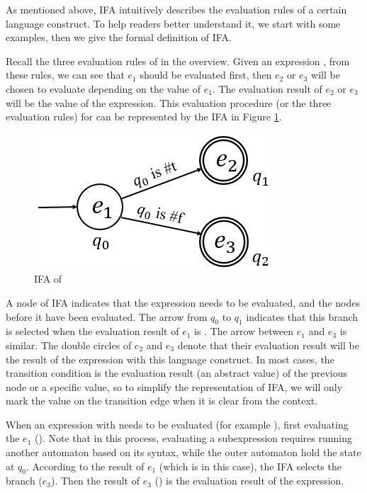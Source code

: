 As mentioned above, IFA intuitively describes the evaluation rules of a certain language construct. To help readers better understand it, we start with some examples, then we give the formal definition of IFA.

\begin{example}[IFA of~~ \m{if}]

    Recall the three evaluation rules of  in the overview. Given an expression , from these rules, we can see that $e_1$ should be evaluated first, then $e_2$ or $e_3$ will be chosen to evaluate depending on the value of $e_1$. The evaluation result of $e_2$ or $e_3$ will be the value of the expression. This evaluation procedure (or the three evaluation rules) for  can be represented by the IFA in Figure \ref{fig:ifa-if}.

    \begin{figure}[t]
        \centering
        \includegraphics[scale=0.25]{images/ifa/ifa-if.png}
        \caption{IFA of }
        \label{fig:ifa-if}
    \end{figure}

    A node of IFA indicates that the expression needs to be evaluated, and the nodes before it have been evaluated. The arrow from $q_0$ to $q_1$ indicates that this branch is selected when the evaluation result of $e_1$ is . The arrow between $e_1$ and $e_3$ is similar. The double circles of $e_2$ and $e_3$ denote that their evaluation result will be the result of the expression with this language construct. In most cases, the transition condition is the evaluation result (an abstract value) of the previous node or a specific value, so to simplify the representation of IFA, we will only mark the value on the transition edge when it is clear from the context.

    When an expression with  needs to be evaluated (for example ), first evaluating the $e_1$ (). Note that in this process, evaluating a subexpression requires running another automaton based on its syntax, while the outer automaton hold the state at $q_0$. According to the result of $e_1$ (which is  in this case), the IFA selects the branch ($e_3$). Then the result of $e_3$ () is the evaluation result of the expression.
    \myend
\end{example}

